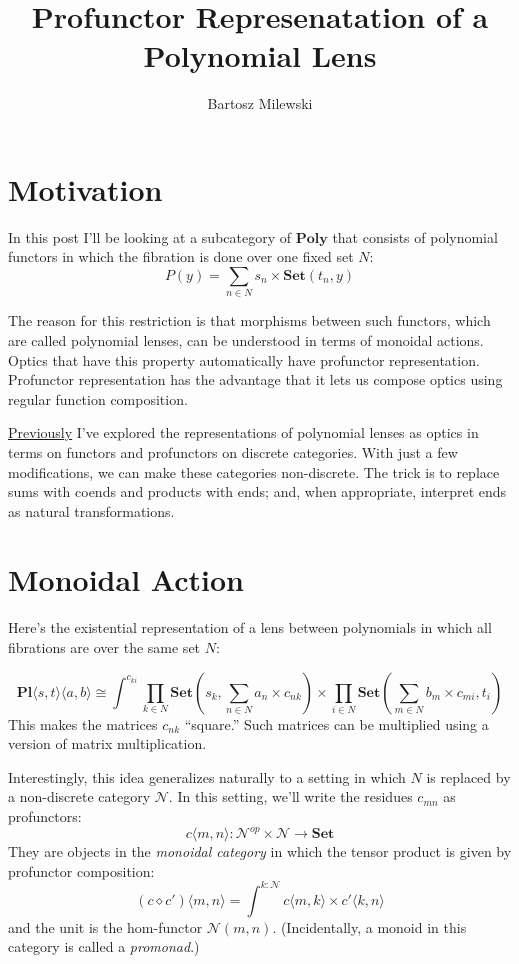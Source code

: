 \documentclass[11pt]{amsart}
\author{Bartosz Milewski}
\title{Profunctor Represenatation of a Polynomial Lens}
\begin{document}
\maketitle{}

\section{Motivation}

In this post I'll be looking at a subcategory of $\mathbf{Poly}$ that consists of polynomial functors in which the fibration is done over one fixed set $N$:
\[ P(y) = \sum_{n \in N} s_n \times \mathbf{Set}(t_n, y) \]

The reason for this restriction is that morphisms between such functors, which are called polynomial lenses, can be understood in terms of monoidal actions. Optics that have this property automatically have profunctor representation. Profunctor representation has the advantage that it lets us compose optics using regular function composition. 

\href{https://bartoszmilewski.com/2021/12/07/polylens/}{Previously} I've explored the representations of polynomial lenses as optics in terms on functors and profunctors on discrete categories. With just a few modifications, we can make these categories non-discrete. The trick is to replace sums with coends and products with ends; and, when appropriate, interpret ends as natural transformations. 

\section{Monoidal Action}

Here's the existential representation of a lens between polynomials in which all fibrations are over the same set $N$:

\[ \mathbf{Pl}\langle s, t\rangle \langle a, b\rangle \cong \int^{c_{k i}} 
 \prod_{k \in N} \mathbf{Set} \left(s_k,  \sum_{n \in N} a_n \times c_{n k} \right) \times 
 \prod_{i \in N}  \mathbf{Set} \left(\sum_{m \in N} b_m \times c_{m i}, t_i \right) \]
This makes the matrices $c_{n k}$ ``square.'' Such matrices can be multiplied using a version of matrix multiplication. 

Interestingly, this idea generalizes naturally to a setting in which $N$ is replaced by a non-discrete category $\mathcal{N}$. In this setting, we'll write the residues $c_{m n}$ as profunctors:
\[ c \langle m, n \rangle \colon \mathcal{N}^{op} \times \mathcal{N} \to \mathbf{Set} \]
They are objects in the \emph{monoidal category} in which the tensor product is given by profunctor composition:
\[ (c \diamond c') \langle m, n \rangle = \int^{k \colon \mathcal{N}} c \langle m, k \rangle \times c' \langle k, n \rangle \]
and the unit is the hom-functor $\mathcal{N}(m, n)$. (Incidentally, a monoid in this category is called a \emph{promonad}.)
\end{document}
